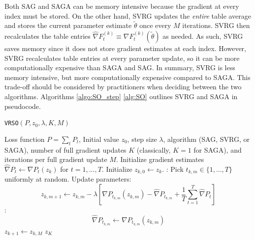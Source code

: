 %
Both SAG and SAGA can be memory intensive because the gradient at every index must be stored. On the other hand, SVRG updates the \textit{entire} table average and stores the current parameter estimate $\tilde \theta$ once every $M$ iterations. SVRG then recalculates the table entries $\widehat \nabla F^{(k)}_{t} \equiv \nabla F^{(k)}_{t}(\tilde \theta)$ as needed. As such, SVRG saves memory since it does not store gradient estimates at each index. However, SVRG recalculates table entries at every parameter update, so it can be more computationally expensive than SAGA and SAG. In summary, SVRG is less memory intensive, but more computationally expensive compared to SAGA. This trade-off should be considered by practitioners when deciding between the two algorithms. Algorithms \ref{algo:SO_step} \ref{alg:SO} outlines SVRG and SAGA in pseudocode.

\begin{algorithm}
\caption{\texttt{VRSO}$\left(P,z_0,\lambda,K,M\right)$}\label{alg:SO}
\begin{algorithmic}[1]
\Require Loss function $P = \sum_t P_t$, Initial value $z_0$, step size $\lambda$, algorithm (SAG, SVRG, or SAGA), number of full gradient updates $K$ (classically, $K = 1$ for SAGA), and iterations per full gradient update $M$.
%
\State Initialize gradient estimates $\widehat \nabla P_t \leftarrow \nabla P_t (z_k)$ for $t = 1, ..., T.$
\State Initialize $z_{k,0} \leftarrow z_k$.
%
:
    \State Pick $t_{k,m} \in \{1,\ldots,T\}$ uniformly at random.
    \State Update parameters:
    \begin{equation}
        z_{k,m+1} \gets z_{k,m} - \lambda \left[\nabla P_{t_{k,m}}(z_{k,m}) - \widehat \nabla P_{t_{k,m}} + \frac{1}{T} \sum_{t=1}^T \widehat \nabla P_{t} \right]
        \label{eqn:SAGA_update0}
    \end{equation}
    :
        \begin{equation}
            \widehat \nabla P_{t_{k,m}} \leftarrow \nabla P_{t_{k,m}}(z_{k,m}) 
        \end{equation}
    \EndIf
\EndFor
\State $z_{k+1} \gets z_{k,M}$
\EndFor
\State \Return $z_K$
\end{algorithmic}
\end{algorithm}